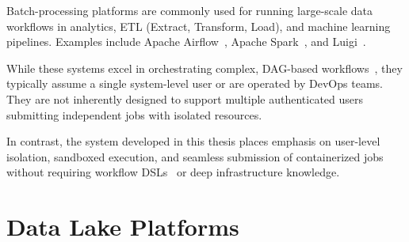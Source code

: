 Batch-processing platforms are commonly used for running large-scale data workflows in analytics, ETL (Extract, Transform, Load), 
and machine learning pipelines. Examples include Apache Airflow~\cite{airflow}, Apache Spark~\cite{spark}, and Luigi~\cite{luigi}.

While these systems excel in orchestrating complex, DAG-based workflows~\cite{airflow-dag}, they typically assume a single system-level user or are 
operated by DevOps teams. They are not inherently designed to support multiple authenticated users submitting independent jobs with 
isolated resources.

In contrast, the system developed in this thesis places emphasis on user-level isolation, sandboxed execution, and seamless 
submission of containerized jobs without requiring workflow DSLs~\cite{fowler-dsl} or deep infrastructure knowledge.

\section{Data Lake Platforms}

